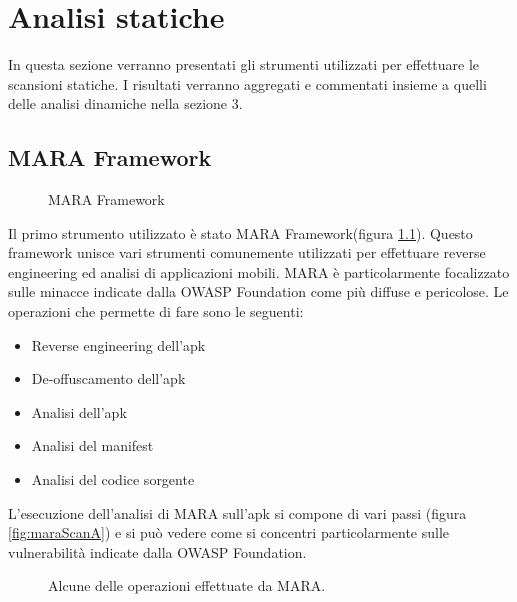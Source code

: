 \chapter{Analisi statiche}
In questa sezione verranno presentati gli strumenti utilizzati per effettuare le scansioni statiche. I risultati verranno aggregati e commentati insieme a quelli delle analisi dinamiche nella sezione $3$.


\section{MARA Framework}

\begin{figure}[h]
	\centering 
	\caption{MARA Framework}
	\label{fig:mara} 
\end{figure}

Il primo strumento utilizzato è stato \ac{MARA} Framework(figura \ref{fig:mara})\cite{MARA}. Questo framework unisce vari strumenti comunemente utilizzati per effettuare reverse engineering ed analisi di applicazioni mobili. MARA è particolarmente focalizzato sulle minacce indicate dalla OWASP Foundation\cite{OWASP} come più diffuse e pericolose.
Le operazioni che permette di fare sono le seguenti:
\begin{itemize}
	\item Reverse engineering dell'apk
	\item De-offuscamento dell'apk
	\item Analisi dell'apk
	\item Analisi del manifest
	\item Analisi del codice sorgente
\end{itemize}

L'esecuzione dell'analisi di MARA sull'apk si compone di vari passi (figura \ref{fig:maraScanA}) e si può vedere come si concentri particolarmente sulle vulnerabilità indicate dalla OWASP Foundation.
\begin{figure}[h]
	\centering
	\caption{Alcune delle operazioni effettuate da MARA.}
\end{figure}

